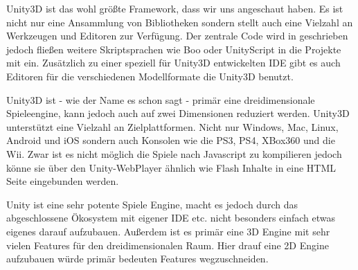 Unity3D ist das wohl größte Framework, dass wir uns angeschaut haben. Es ist nicht nur eine Ansammlung von Bibliotheken sondern stellt auch eine Vielzahl an Werkzeugen und Editoren zur Verfügung. Der zentrale Code wird in \CS geschrieben jedoch fließen weitere Skriptsprachen wie Boo oder UnityScript in die Projekte mit ein.
Zusätzlich zu einer speziell für Unity3D entwickelten IDE gibt es auch Editoren für die verschiedenen Modellformate die Unity3D benutzt.

Unity3D ist - wie der Name es schon sagt - primär eine dreidimensionale Spieleengine, kann jedoch auch auf zwei Dimensionen reduziert werden.
Unity3D unterstützt eine Vielzahl an Zielplattformen. Nicht nur Windows, Mac, Linux, Android und iOS sondern auch Konsolen wie die PS3, PS4, XBox360 und die Wii. Zwar ist es nicht möglich die Spiele nach Javascript zu kompilieren jedoch könne sie über den Unity-WebPlayer ähnlich wie Flash Inhalte in eine HTML Seite eingebunden werden.

Unity ist eine sehr potente Spiele Engine, macht es jedoch durch das abgeschlossene Ökosystem mit eigener IDE etc. nicht besonders einfach etwas eigenes darauf aufzubauen. Außerdem ist es primär eine 3D Engine mit sehr vielen Features für den dreidimensionalen Raum. Hier drauf eine 2D Engine aufzubauen würde primär bedeuten Features wegzuschneiden.